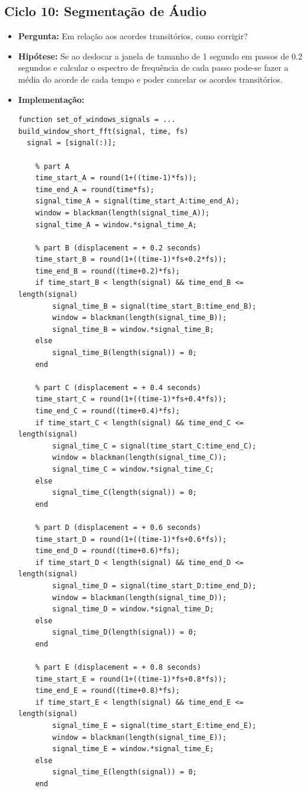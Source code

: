 \subsection{Ciclo 10: Segmentação de Áudio}
\label{subsec:ciclo_10}
\begin{itemize}
\item \textbf{Pergunta:} Em relação aos acordes transitórios, como corrigir?
\item \textbf{Hipótese:} Se ao deslocar a janela de tamanho de 1 segundo em passos de 0.2 segundos e calcular o espectro de frequência de cada passo pode-se fazer a média do acorde de cada tempo e poder cancelar os acordes transitórios.
\item \textbf{Implementação:}
\begin{lstlisting}
function set_of_windows_signals = ...
build_window_short_fft(signal, time, fs)
  signal = [signal(:)];

    % part A
    time_start_A = round(1+((time-1)*fs));
    time_end_A = round(time*fs);
    signal_time_A = signal(time_start_A:time_end_A);
    window = blackman(length(signal_time_A));
    signal_time_A = window.*signal_time_A;

    % part B (displacement = + 0.2 seconds)
    time_start_B = round(1+((time-1)*fs+0.2*fs));
    time_end_B = round((time+0.2)*fs);
    if time_start_B < length(signal) && time_end_B <= length(signal)
        signal_time_B = signal(time_start_B:time_end_B);
        window = blackman(length(signal_time_B));
        signal_time_B = window.*signal_time_B;
    else
        signal_time_B(length(signal)) = 0;
    end

    % part C (displacement = + 0.4 seconds)
    time_start_C = round(1+((time-1)*fs+0.4*fs));
    time_end_C = round((time+0.4)*fs);
    if time_start_C < length(signal) && time_end_C <= length(signal)
        signal_time_C = signal(time_start_C:time_end_C);
        window = blackman(length(signal_time_C));
        signal_time_C = window.*signal_time_C;
    else
        signal_time_C(length(signal)) = 0;
    end

    % part D (displacement = + 0.6 seconds)
    time_start_D = round(1+((time-1)*fs+0.6*fs));
    time_end_D = round((time+0.6)*fs);
    if time_start_D < length(signal) && time_end_D <= length(signal)
        signal_time_D = signal(time_start_D:time_end_D);
        window = blackman(length(signal_time_D));
        signal_time_D = window.*signal_time_D;
    else
        signal_time_D(length(signal)) = 0;
    end

    % part E (displacement = + 0.8 seconds)
    time_start_E = round(1+((time-1)*fs+0.8*fs));
    time_end_E = round((time+0.8)*fs);
    if time_start_E < length(signal) && time_end_E <= length(signal)
        signal_time_E = signal(time_start_E:time_end_E);
        window = blackman(length(signal_time_E));
        signal_time_E = window.*signal_time_E;
    else
        signal_time_E(length(signal)) = 0;
    end


\end{lstlisting}
\end{itemize}
